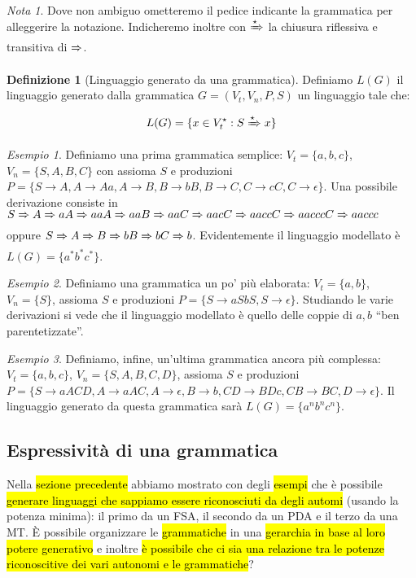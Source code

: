 \documentclass[a4paper,11pt,oneside]{article}
\theoremstyle{plain}
\theoremstyle{definition}
\newtheorem{defn}{Definizione}[section]
\theoremstyle{remark}
\newtheorem{esempio}{Esempio}[section]
\newtheorem*{nota}{Nota}
\newcommand*{\deriv}[1][]{\xRightarrow[#1]{}}
\newcommand*{\derivstar}[1][]{\xRightarrow[#1]{\star}}
\begin{document}
\begin{nota}
  Dove non ambiguo ometteremo il pedice indicante la grammatica per alleggerire
  la notazione. Indicheremo inoltre con $\derivstar$ la chiusura riflessiva
  e transitiva di $\deriv$.
\end{nota}

\begin{defn}[Linguaggio generato da una grammatica]\label{def:ling-gen-grammatica}
  Definiamo $L(G)$ il linguaggio generato dalla grammatica
  $G = (V_t, V_n, P, S)$ un linguaggio tale che:

  \[
    L(G) = \{ x \in V_t^\star : S \derivstar x \}
  \]
\end{defn}

\begin{esempio}
  Definiamo una prima grammatica semplice: $V_t = \{a,b,c\}$, $V_n =
  \{S,A,B,C\}$ con assioma $S$ e produzioni $P = \{S \to A, A \to Aa, A \to B,
  B \to bB, B \to C, C \to cC, C \to \epsilon \}$. Una possibile derivazione
  consiste in $S \deriv A \deriv aA \deriv aaA \deriv aaB \deriv aaC \deriv aacC
  \deriv aaccC \deriv aacccC \deriv aaccc$ oppure $S \deriv A \deriv B \deriv bB
  \deriv bC \deriv b$. Evidentemente il linguaggio modellato è $L(G) =
  \{a^*b^*c^*\}$.
\end{esempio}

\begin{esempio}
  Definiamo una grammatica un po' più elaborata: $V_t = \{a,b\}$, $V_n = \{S\}$,
  assioma $S$ e produzioni $P = \{S \to aSbS, S \to \epsilon\}$. Studiando le
  varie derivazioni si vede che il linguaggio modellato è quello delle coppie di
  $a,b$ ``ben parentetizzate''.
\end{esempio}

\begin{esempio}
  Definiamo, infine, un'ultima grammatica ancora più complessa: $V_t =
  \{a,b,c\}$, $V_n = \{S,A,B,C,D\}$, assioma $S$ e produzioni
  $P = \{S \to aACD, A \to aAC, A \to \epsilon, B \to b, CD \to BDc, CB \to BC,
  D \to \epsilon\}$. Il linguaggio generato da questa grammatica sarà $L(G) =
  \{a^n b^n c^n \}$.
\end{esempio}

\subsection{Espressività di una grammatica}\label{sec:espressivita-grammatica}

Nella \hl{sezione precedente} abbiamo mostrato con degli \hl{esempi} che è
possibile \hl{generare linguaggi che sappiamo essere riconosciuti da degli
automi} (usando la potenza minima): il primo da un FSA, il secondo da un PDA e
il terzo da una MT\@.  È possibile organizzare le \hl{grammatiche} in una
\hl{gerarchia in base al loro potere generativo} e inoltre \hl{è possibile che
ci sia una relazione tra le potenze riconoscitive dei vari autonomi e le
grammatiche}?
\end{document}
